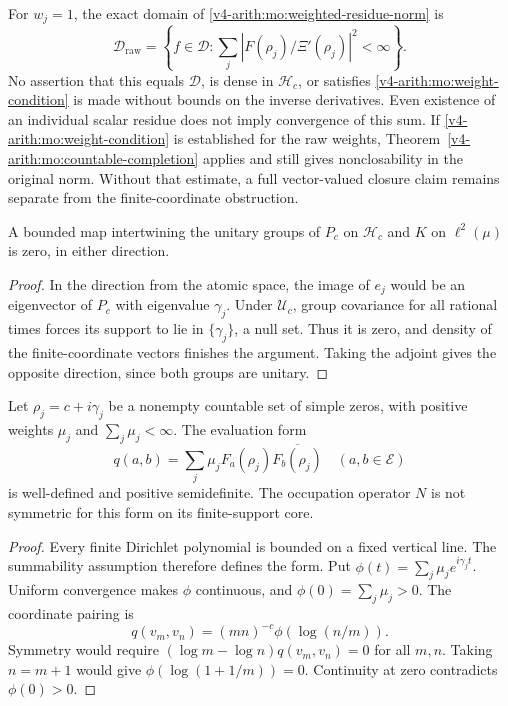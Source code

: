 For $w_j=1$, the exact domain of \eqref{v4-arith:mo:weighted-residue-norm}
is
\[
 \mathscr D_{\mathrm{raw}}=
 \left\{f\in\mathscr D:
 \sum_j|F(\rho_j)/\Xi'(\rho_j)|^2<\infty\right\}.
\]
No assertion that this equals $\mathscr D$, is dense in
$\mathscr H_c$, or satisfies \eqref{v4-arith:mo:weight-condition} is made
without bounds on the inverse derivatives. Even existence of an
individual scalar residue does not imply convergence of this sum.
If \eqref{v4-arith:mo:weight-condition} is established for the raw weights,
Theorem~\ref{v4-arith:mo:countable-completion} applies and still gives
nonclosability in the original norm. Without that estimate, a
full vector-valued closure claim remains separate from the
finite-coordinate obstruction.

\begin{proposition}
\label{v4-arith:mo:bounded-transfer}
A bounded map intertwining the unitary groups of $P_c$ on
$\mathscr H_c$ and $K$ on $\ell^2(\mu)$ is zero, in either
direction.
\end{proposition}
\begin{proof}
In the direction from the atomic space, the image of $e_j$ would
be an eigenvector of $P_c$ with eigenvalue $\gamma_j$.
Under $\mathcal U_c$, group covariance for all rational times
forces its support to lie in $\{\gamma_j\}$, a null set.
Thus it is zero, and density of the finite-coordinate vectors
finishes the argument. Taking the adjoint gives the opposite
direction, since both groups are unitary.
\end{proof}

\begin{proposition}
\label{v4-arith:mo:occupation-positive-obstruction}
Let $\rho_j=c+i\gamma_j$ be a nonempty countable set of simple
zeros, with positive weights $\mu_j$ and
$\sum_j\mu_j<\infty$. The evaluation form
\[
 q(a,b)=\sum_j\mu_jF_a(\rho_j)\overline{F_b(\rho_j)}
 \quad(a,b\in\mathscr E)
\]
is well-defined and positive semidefinite. The occupation operator
$N$ is not symmetric for this form on its finite-support core.
\end{proposition}
\begin{proof}
Every finite Dirichlet polynomial is bounded on a fixed vertical
line. The summability assumption therefore defines the form.
Put $\phi(t)=\sum_j\mu_je^{i\gamma_jt}$. Uniform convergence
makes $\phi$ continuous, and $\phi(0)=\sum_j\mu_j>0$.
The coordinate pairing is
\[
 q(v_m,v_n)=(mn)^{-c}\phi(\log(n/m)).
\]
Symmetry would require
$(\log m-\log n)q(v_m,v_n)=0$ for all $m,n$.
Taking $n=m+1$ would give
$\phi(\log(1+1/m))=0$. Continuity at zero contradicts
$\phi(0)>0$.
\end{proof}

